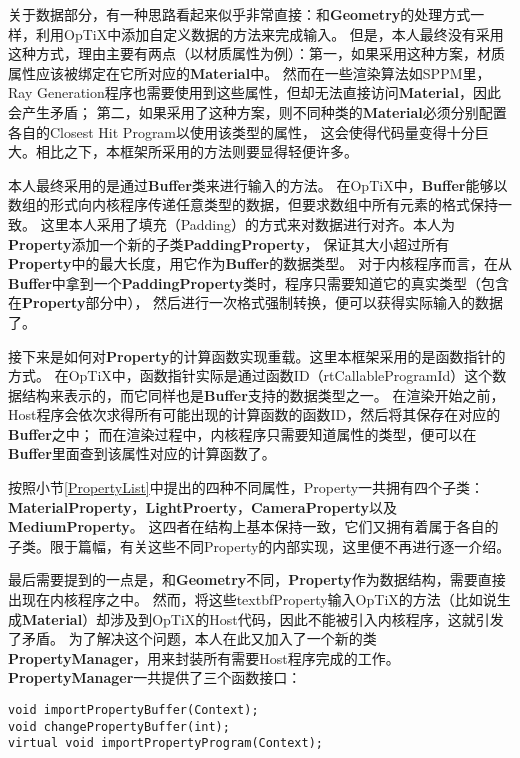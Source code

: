 关于数据部分，有一种思路看起来似乎非常直接：和\textbf{Geometry}的处理方式一样，利用OpTiX中添加自定义数据的方法来完成输入。
但是，本人最终没有采用这种方式，理由主要有两点（以材质属性为例）：第一，如果采用这种方案，材质属性应该被绑定在它所对应的\textbf{Material}中。
然而在一些渲染算法如SPPM里，Ray Generation程序也需要使用到这些属性，但却无法直接访问\textbf{Material}，因此会产生矛盾；
第二，如果采用了这种方案，则不同种类的\textbf{Material}必须分别配置各自的Closest Hit Program以使用该类型的属性，
这会使得代码量变得十分巨大。相比之下，本框架所采用的方法则要显得轻便许多。

本人最终采用的是通过\textbf{Buffer}类来进行输入的方法。
在OpTiX中，\textbf{Buffer}能够以数组的形式向内核程序传递任意类型的数据，但要求数组中所有元素的格式保持一致。
这里本人采用了填充（Padding）的方式来对数据进行对齐。本人为\textbf{Property}添加一个新的子类\textbf{PaddingProperty}，
保证其大小超过所有\textbf{Property}中的最大长度，用它作为\textbf{Buffer}的数据类型。
对于内核程序而言，在从\textbf{Buffer}中拿到一个\textbf{PaddingProperty}类时，程序只需要知道它的真实类型（包含在\textbf{Property}部分中），
然后进行一次格式强制转换，便可以获得实际输入的数据了。


接下来是如何对\textbf{Property}的计算函数实现重载。这里本框架采用的是函数指针的方式。
在OpTiX中，函数指针实际是通过函数ID（rtCallableProgramId）这个数据结构来表示的，而它同样也是\textbf{Buffer}支持的数据类型之一。
在渲染开始之前，Host程序会依次求得所有可能出现的计算函数的函数ID，然后将其保存在对应的\textbf{Buffer}之中；
而在渲染过程中，内核程序只需要知道属性的类型，便可以在\textbf{Buffer}里面查到该属性对应的计算函数了。

按照小节\ref{PropertyList}中提出的四种不同属性，Property一共拥有四个子类：\textbf{\textbf{Material}Property}，\textbf{LightProerty}，\textbf{CameraProperty}以及\textbf{MediumProperty}。
这四者在结构上基本保持一致，它们又拥有着属于各自的子类。限于篇幅，有关这些不同Property的内部实现，这里便不再进行逐一介绍。

最后需要提到的一点是，和\textbf{Geometry}不同，\textbf{Property}作为数据结构，需要直接出现在内核程序之中。
然而，将这些textbf{Property}输入OpTiX的方法（比如说生成\textbf{Material}）却涉及到OpTiX的Host代码，因此不能被引入内核程序，这就引发了矛盾。
为了解决这个问题，本人在此又加入了一个新的类\textbf{PropertyManager}，用来封装所有需要Host程序完成的工作。\textbf{PropertyManager}一共提供了三个函数接口：

\lstset{language=C++}
\begin{lstlisting}
void importPropertyBuffer(Context);
void changePropertyBuffer(int);
virtual void importPropertyProgram(Context);
\end{lstlisting}

